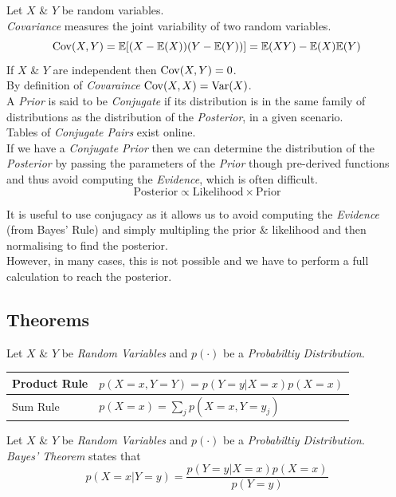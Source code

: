 \documentclass[11pt,a4paper]{article}
\begin{document}
Let $X$ \& $Y$ be random variables.\\
\textit{Covariance}  measures the joint variability of two random variables.\\
$$\mathrm{Cov}(X,Y)=\mathbb{E}[(X-\mathbb{E}(X))(Y-\mathbb{E}(Y))]=\mathbb{E}(XY)-\mathbb{E}(X)\mathbb{E}(Y)$$
If $X$ \& $Y$ are independent then $\mathrm{Cov}(X,Y)=0$.\\
\nb By definition of \textit{Covaraince} $\mathrm{Cov}(X,X)=\mathrm{Var}(X)$.\\

A \textit{Prior} is said to be \textit{Conjugate} if its distribution is in the same family of distributions as the distribution of the \textit{Posterior}, in a given scenario.\\
\nb Tables of \textit{Conjugate Pairs} exist online.\\

If we have a \textit{Conjugate Prior} then we can determine the distribution of the \textit{Posterior} by passing the parameters of the \textit{Prior} though pre-derived functions and thus avoid computing the \textit{Evidence}, which is often difficult.
$$\text{Posterior}\propto\text{Likelihood}\times\text{Prior}$$

It is useful to use conjugacy as it allows us to avoid computing the \textit{Evidence} (from Bayes' Rule) and simply multipling the prior \& likelihood and then normalising to find the posterior.\\
However, in many cases, this is not possible and we have to perform a full calculation to reach the posterior.

\subsection{Theorems}

Let $X$ \& $Y$ be \textit{Random Variables} and $p(\cdot)$ be a \textit{Probabiltiy Distribution}.
\begin{center}\begin{tabular}{|l|l|}
\hline
Product Rule&$p(X=x,Y=Y)=p(Y=y|X=x)p(X=x)$\\
\hline
Sum Rule&$p(X=x)=\sum_jp(X=x,Y=y_j)$\\
\hline
\end{tabular}\end{center}

Let $X$ \& $Y$ be \textit{Random Variables} and $p(\cdot)$ be a \textit{Probabiltiy Distribution}.\\
\textit{Bayes' Theorem} states that
$$p(X=x|Y=y)=\frac{p(Y=y|X=x)p(X=x)}{p(Y=y)}$$
\end{document}
